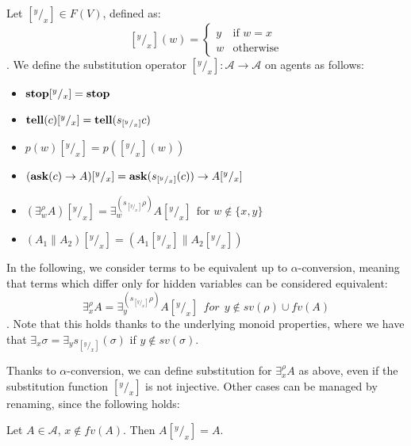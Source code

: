 \documentclass{llncs}
\newcommand{\tell}{{\bf tell}}
\newcommand{\ask}{{\bf ask}}
\newcommand{\ostop}{{\bf stop}}
\newcommand{\rarrow}{\rightarrow}
\begin{document}
\begin{definition}[Substitutions]
Let $[^y/_x] \in F(V)$, defined as: 
\[ [^y/_x](w) = 
		\begin{cases} 
			y & \text{if $w = x$} \\
            w & \text{otherwise}
        \end{cases} \].
We define the substitution operator $[^y/_x]: \mathcal{A} \rarrow \mathcal{A}$ on agents as follows: 

\begin{itemize}
	\item $\ostop[^y/_x] = \ostop$
	\item $\tell(c)[^y/_x] = \tell(s_{[^y/_x]}c)$
	\item $p(w)[^y/_x] =  p([^y/_x](w))$
	\item $(\ask(c) \rightarrow A)[^y/_x] = \ask(s_{[^y/_x]}(c)) \rightarrow A[^y/_x]$
    \item $(\exists^{\rho}_w A)[^y/_x] = \exists^{(s_{[^y/_x]} \rho)}_w A[^y/_x] \ \
    \text{for $w \not \in \{x, y\}$}$
	\item $(A_1 \parallel A_2)[^y/_x]  = (A_1[^y/_x] \parallel A_2[^y/_x])$
\end{itemize}
\end{definition}

\begin{remark}
In the following, we consider terms to be equivalent up to $\alpha$-conversion, meaning that terms which differ only for hidden variables can be considered equivalent:
\[\exists_x^\rho A = \exists_y^{(s_{[^y/_x]}\rho)} A[^y/_x] \ \ for \ \ y \not \in sv(\rho) \cup fv(A)\].
Note that this holds thanks to the underlying monoid properties, where we have that $\exists_x \sigma = \exists_y s_{[^y/_x]}(\sigma)$ if $y \not \in sv(\sigma)$.
\end{remark}

Thanks to $\alpha$-conversion, we can define substitution for $\exists^{\rho}_x A$ as above, even if the substitution function $[^y/_x]$ is not injective. Other cases can be managed by renaming, since the following holds:

\begin{proposition}
Let $A \in \mathcal{A}$, $x \not \in fv(A)$. Then $A[^y/_x] = A$.
\end{proposition}
\end{document}
